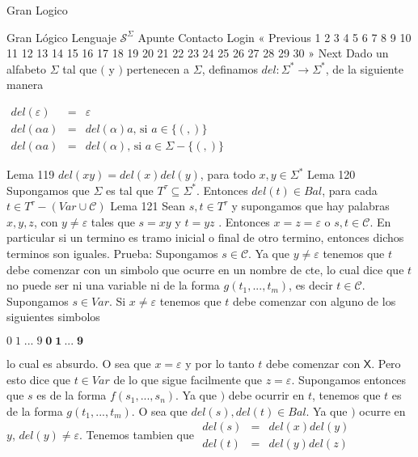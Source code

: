 Gran Logico

Gran Lógico
Lenguaje \(\mathcal{S}^{\Sigma }\)
Apunte
Contacto
Login
« Previous
1
2
3
4
5
6
7
8
9
10
11
12
13
14
15
16
17
18
19
20
21
22
23
24
25
26
27
28
29
30
» Next
Dado un alfabeto \(\Sigma \) tal que \((\) y \()\) pertenecen a \(\Sigma \), definamos \(del:\Sigma ^{\ast }\rightarrow \Sigma ^{\ast }\), de la siguiente manera

\(\displaystyle \begin{array}{rcl} del(\varepsilon ) & =& \varepsilon \\ del(\alpha a) & =& del(\alpha )a\text{, si }a\in \{(,)\} \\ del(\alpha a) & =& del(\alpha )\text{, si }a\in \Sigma -\{(,)\} \end{array} \)

Lema 119 \(del(xy)=del(x)del(y)\), para todo \(x,y\in \Sigma ^{\ast }\)
Lema 120 Supongamos que \(\Sigma \) es tal que \(T^{\tau }\subseteq \Sigma ^{\ast }\). Entonces \(del(t)\in Bal\), para cada \(t\in T^{\tau }-(Var\cup \mathcal{C})\)
Lema 121 Sean \(s,t\in T^{\tau }\) y supongamos que hay palabras \( x,y,z\), con \(y\neq \varepsilon \) tales que \(s=xy\) y \(t=yz\) . Entonces \( x=z=\varepsilon \) o \(s,t\in \mathcal{C}\). En particular si un termino es tramo inicial o final de otro termino, entonces dichos terminos son iguales.
Prueba: Supongamos \(s\in \mathcal{C}\). Ya que \(y\neq \varepsilon \) tenemos que \(t\) debe comenzar con un simbolo que ocurre en un nombre de cte, lo cual dice que \(t\) no puede ser ni una variable ni de la forma \(g(t_{1},...,t_{m})\), es decir \(t\in \mathcal{C}\). Supongamos \(s\in Var\). Si \(x\neq \varepsilon \) tenemos que \(t\) debe comenzar con alguno de los siguientes simbolos

\(\displaystyle \mathit{0}\;\mathit{1\;}...\;\mathit{9}\;\mathbf{0}\;\mathbf{1}\ ...\; \mathbf{9} \)

lo cual es absurdo. O sea que \(x=\varepsilon \) y por lo tanto \(t\) debe comenzar con \(\mathsf{X}\). Pero esto dice que \(t\in Var\) de lo que sigue facilmente que \(z=\varepsilon \). Supongamos entonces que \(s\) es de la forma \( f(s_{1},...,s_{n})\). Ya que \()\) debe ocurrir en \(t\), tenemos que \(t\) es de la forma \(g(t_{1},...,t_{m})\). O sea que \(del(s),del(t)\in Bal\). Ya que \()\) ocurre en \(y\), \(del(y)\neq \varepsilon \). Tenemos tambien que
\(\displaystyle \begin{array}{rcl} del(s) & =& del(x)del(y) \\ del(t) & =& del(y)del(z) \end{array} \)

